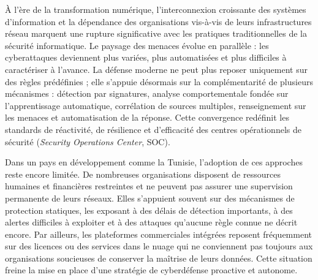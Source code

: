 
\label{chap:intro}
À l'ère de la transformation numérique, l'interconnexion croissante des systèmes d'information et la dépendance des organisations vis-à-vis de leurs infrastructures réseau marquent une rupture significative avec les pratiques traditionnelles de la sécurité informatique. Le paysage des menaces évolue en parallèle : les cyberattaques deviennent plus variées, plus automatisées et plus difficiles à caractériser à l'avance. La défense moderne ne peut plus reposer uniquement sur des règles prédéfinies ; elle s'appuie désormais sur la complémentarité de plusieurs mécanismes : détection par signatures, analyse comportementale fondée sur l'apprentissage automatique, corrélation de sources multiples, renseignement sur les menaces et automatisation de la réponse. Cette convergence redéfinit les standards de réactivité, de résilience et d'efficacité des centres opérationnels de sécurité (\textit{Security Operations Center}, SOC).

Dans un pays en développement comme la Tunisie, l'adoption de ces approches reste encore limitée. De nombreuses organisations disposent de ressources humaines et financières restreintes et ne peuvent pas assurer une supervision permanente de leurs réseaux. Elles s'appuient souvent sur des mécanismes de protection statiques, les exposant à des délais de détection importants, à des alertes difficiles à exploiter et à des attaques qu'aucune règle connue ne décrit encore. Par ailleurs, les plateformes commerciales intégrées reposent fréquemment sur des licences ou des services dans le nuage qui ne conviennent pas toujours aux organisations soucieuses de conserver la maîtrise de leurs données. Cette situation freine la mise en place d'une stratégie de cyberdéfense proactive et autonome.

